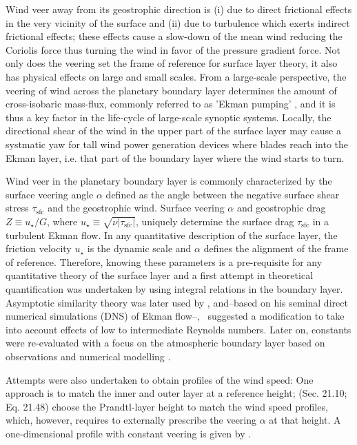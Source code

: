 \documentclass[a4paper,11pt]{amsart}
\newcommand{\SFC}{\mathrm{sfc}}
\begin{document}
Wind veer away from its geostrophic direction is
(i) due to direct frictional effects in the very vicinity of the surface and
(ii) due to turbulence which exerts indirect frictional effects; these effects
cause a slow-down of the mean wind reducing the Coriolis force thus turning the wind
in favor of the pressure gradient force. 
Not only does the veering set the frame of reference for surface layer theory, it also has
physical effects on large and small scales.
%
From a large-scale perspective, the veering of wind across the planetary boundary layer determines
the amount of cross-isobaric mass-flux, commonly referred to as 'Ekman pumping' \citep{ekman:AMA1905},
and it is thus a key factor in the life-cycle of large-scale synoptic systems.
%
% 
Locally, the directional shear of the wind in the upper part of the surface layer may cause a systmatic yaw
for tall wind power generation devices where blades reach into the Ekman layer, i.e. that part of the boundary
layer where the wind starts to turn. 
%
\par
%
Wind veer in the planetary boundary layer is commonly characterized by the surface veering angle $\alpha$
defined as the angle between the negative surface shear stress $\tau_\SFC$ and the geostrophic wind.
%
Surface veering $\alpha$ and geostrophic drag $Z\equiv u_\star/G$, where $u_\star\equiv\sqrt{\nu|\tau_\SFC|}$,
uniquely determine the surface drag $\tau_\SFC$ in a turbulent Ekman flow. 
%
In any quantitative description of the surface layer, the friction velocity $u_\star$ is the dynamic scale
and $\alpha$ defines the alignment of the frame of reference.
%
Therefore, knowing these parameters is a pre-requisite for any quantitative theory of the surface layer and a first
attempt in theoretical quantification was undertaken by \cite{rossby:PPO1935} using integral relations in the boundary layer.
%
Asymptotic similarity theory was later used by \cite{tennekes:JAS1973, blackadar:JAS1968},
and--based on his seminal direct numerical simulations (DNS) of Ekman flow--,~\cite{spalart:JFM1989} suggested
a modification to take into account effects of low to intermediate Reynolds numbers.
Later on, constants were re-evaluated with a focus on the atmospheric boundary layer based on
observations \cite{hogstrom:BM1988,hogstrom:BM1996}
and numerical modelling \citep{spalart:PF2008, spalart:PF2009, ansorge:BM2014, ansorge:BM2019}. 
%
\par
%
Attempts were also undertaken to obtain profiles of the wind speed: 
One approach is to match the inner and outer layer at a reference height;
\cite{etling:2002, emeis:2018}  (Sec. 21.10; Eq. 21.48) choose the Prandtl-layer height to match
the wind speed profiles, which, however, requires to externally prescribe the veering $\alpha$ at that height. 
A one-dimensional profile with constant veering is given by \cite[Sec. 3; Eq. 3.1-3.19]{emeis:m2007}. 
\end{document}
